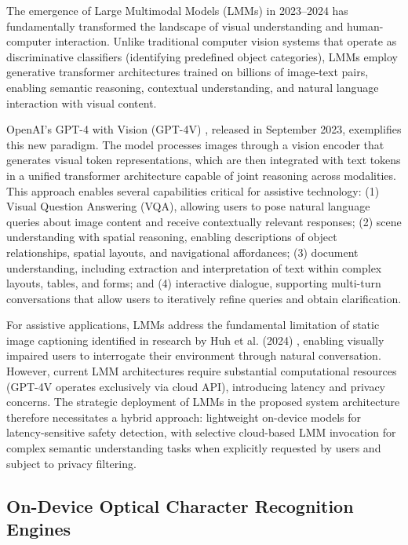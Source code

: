 \documentclass[a4paper]{report}
\begin{document}
The emergence of Large Multimodal Models (LMMs) in 2023--2024 has fundamentally transformed the landscape of visual understanding and human-computer interaction. Unlike traditional computer vision systems that operate as discriminative classifiers (identifying predefined object categories), LMMs employ generative transformer architectures trained on billions of image-text pairs, enabling semantic reasoning, contextual understanding, and natural language interaction with visual content.

OpenAI's GPT-4 with Vision (GPT-4V) \cite{openai_gpt4v}, released in September 2023, exemplifies this new paradigm. The model processes images through a vision encoder that generates visual token representations, which are then integrated with text tokens in a unified transformer architecture capable of joint reasoning across modalities. This approach enables several capabilities critical for assistive technology: (1) Visual Question Answering (VQA), allowing users to pose natural language queries about image content and receive contextually relevant responses; (2) scene understanding with spatial reasoning, enabling descriptions of object relationships, spatial layouts, and navigational affordances; (3) document understanding, including extraction and interpretation of text within complex layouts, tables, and forms; and (4) interactive dialogue, supporting multi-turn conversations that allow users to iteratively refine queries and obtain clarification.

For assistive applications, LMMs address the fundamental limitation of static image captioning identified in research by Huh et al. (2024) \cite{huh2024longform}, enabling visually impaired users to interrogate their environment through natural conversation. However, current LMM architectures require substantial computational resources (GPT-4V operates exclusively via cloud API), introducing latency and privacy concerns. The strategic deployment of LMMs in the proposed system architecture therefore necessitates a hybrid approach: lightweight on-device models for latency-sensitive safety detection, with selective cloud-based LMM invocation for complex semantic understanding tasks when explicitly requested by users and subject to privacy filtering.

\subsection{On-Device Optical Character Recognition Engines}
\label{subsec:ocr-engines}
\end{document}
